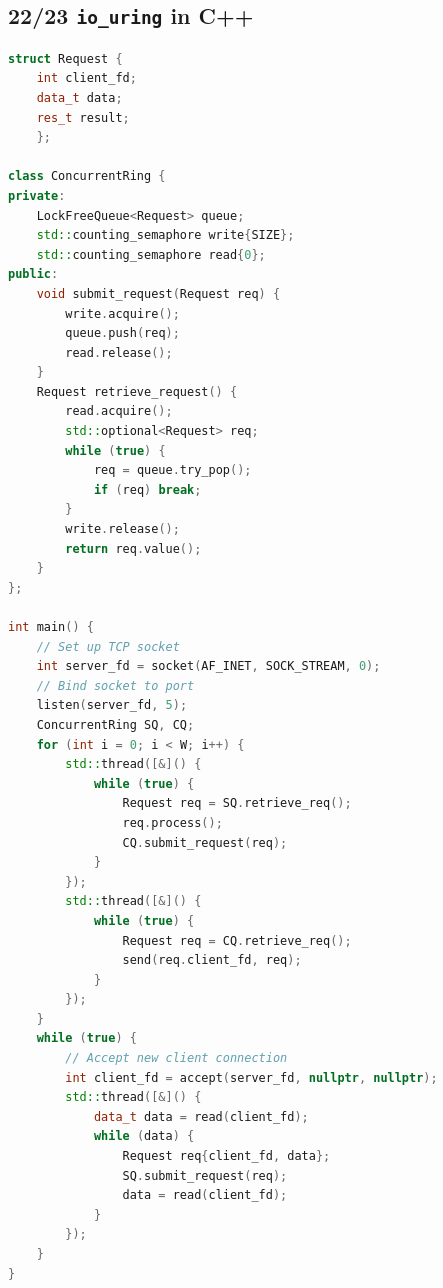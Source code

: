 \documentclass{article}
\begin{document}
\subsection{22/23 \texttt{io\_uring} in C++}
\begin{lstlisting}[language=C++]
struct Request {
    int client_fd;
    data_t data;
    res_t result;
    };

class ConcurrentRing {
private:
    LockFreeQueue<Request> queue;
    std::counting_semaphore write{SIZE};
    std::counting_semaphore read{0};
public:
    void submit_request(Request req) {
        write.acquire();
        queue.push(req);
        read.release();
    }
    Request retrieve_request() {
        read.acquire();
        std::optional<Request> req;
        while (true) {
            req = queue.try_pop();
            if (req) break;
        }
        write.release();
        return req.value();
    }
};

int main() {
    // Set up TCP socket
    int server_fd = socket(AF_INET, SOCK_STREAM, 0);
    // Bind socket to port
    listen(server_fd, 5);
    ConcurrentRing SQ, CQ;
    for (int i = 0; i < W; i++) {
        std::thread([&]() {
            while (true) {
                Request req = SQ.retrieve_req();
                req.process();
                CQ.submit_request(req);
            }
        });
        std::thread([&]() {
            while (true) {
                Request req = CQ.retrieve_req();
                send(req.client_fd, req);
            }
        });
    }
    while (true) {
        // Accept new client connection
        int client_fd = accept(server_fd, nullptr, nullptr);
        std::thread([&]() {
            data_t data = read(client_fd);
            while (data) {
                Request req{client_fd, data};
                SQ.submit_request(req);
                data = read(client_fd);
            }
        });
    }
}
\end{lstlisting}
\end{document}
